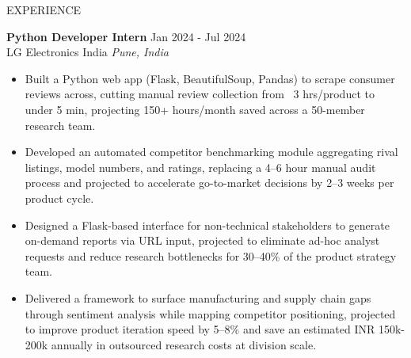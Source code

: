 \documentclass{resume} %
\begin{document}
\vspace{-10pt}

\begin{rSection}{EXPERIENCE}

\textbf{Python Developer Intern} \hfill Jan 2024 - Jul 2024\\
LG Electronics India \hfill \textit{Pune, India}
 \begin{itemize}
    \itemsep -3pt {} 
     \item Built a Python web app (Flask, BeautifulSoup, Pandas) to scrape consumer reviews across, cutting manual review collection from ~3 hrs/product to under 5 min, projecting 150+ hours/month saved across a 50-member research team.
     \item Developed an automated competitor benchmarking module aggregating rival listings, model numbers, and ratings, replacing a 4–6 hour manual audit process and projected to accelerate go-to-market decisions by 2–3 weeks per product cycle.
    \item Designed a Flask-based interface for non-technical stakeholders to generate on-demand reports via URL input, projected to eliminate ad-hoc analyst requests and reduce research bottlenecks for 30–40\% of the product strategy team.
    \item Delivered a framework to surface manufacturing and supply chain gaps through sentiment analysis while mapping competitor positioning, projected to improve product iteration speed by 5–8\% and save an estimated INR 150k-200k annually in outsourced research costs at division scale.
 \end{itemize}
 

\end{rSection} 

\end{document}
